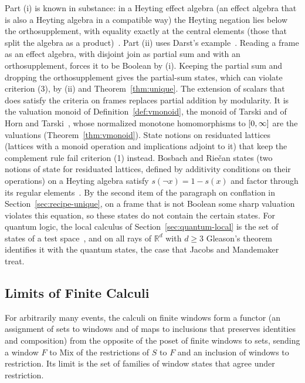 \noindent
Part (i) is known in substance: in a Heyting effect algebra (an effect
algebra that is also a Heyting algebra in a compatible way) the Heyting
negation lies below the orthosupplement, with equality exactly at the
central elements (those that split the algebra as a
product)~\cite{foulis2000}. Part (ii) uses Darst's
example~\cite{darst1970}. Reading a frame as an effect algebra, with
disjoint join as partial sum and with an orthosupplement, forces it to be
Boolean by (i). Keeping the partial sum and dropping the orthosupplement
gives the partial-sum states, which can violate criterion (3), by (ii)
and Theorem~\ref{thm:unique}. The extension of scalars that does satisfy the
criteria on frames replaces partial addition by modularity. It is the
valuation monoid of Definition~\ref{def:vmonoid}, the monoid of Tarski
and of Horn and Tarski~\cite{tarski1938,horn-tarski1948}, whose
normalized monotone homomorphisms to $[0,\infty]$ are the valuations
(Theorem~\ref{thm:vmonoid}). State notions on residuated lattices
(lattices with a monoid operation and implications adjoint to it) that
keep the complement rule fail criterion (1) instead. Bosbach and Riečan
states (two notions of state for residuated lattices, defined by
additivity conditions on their operations) on a Heyting algebra satisfy $s(\neg x) = 1 - s(x)$ and factor
through its regular elements~\cite{dvurecenskij-rachunek2006}. By the
second item of the paragraph on conflation in
Section~\ref{sec:recipe-unique}, on a frame that is not Boolean some sharp
valuation violates this equation, so these states do not contain the
certain states. For quantum logic, the local calculus of
Section~\ref{sec:quantum-local} is the set of states of a test
space~\cite{foulis-randall1972,acin2015}, and on all rays of
$\mathbb{R}^d$ with $d \ge 3$ Gleason's theorem identifies it with the
quantum states, the case that Jacobs and Mandemaker treat.

\subsection{Limits of Finite Calculi}
\label{sec:cat-limit}

For arbitrarily many events, the calculi on finite windows form a
functor (an assignment of sets to windows and of maps to inclusions that
preserves identities and composition) from the opposite of the poset of
finite windows to sets, sending a window $F$ to $\mathrm{Mix}$ of the
restrictions of $S$ to $F$ and an inclusion of windows to restriction.
Its limit is the set of families of window states that agree under
restriction.

